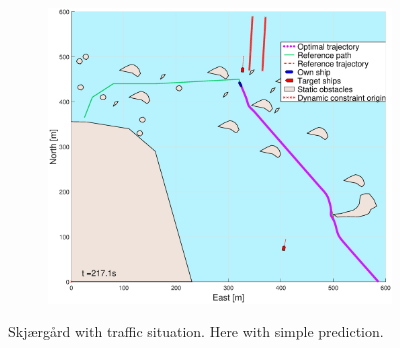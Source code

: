 \begin{figure}[ht]
\begin{subfigure}[b]{0.494\textwidth}
        \subcaption{}
    \end{subfigure}
    \hfill
    \begin{subfigure}[b]{0.494\textwidth}
        \centering
        \includegraphics[width=\textwidth]{Images/NewFigures/skjergard_m_trafikk_NEW/_Simple_1fig999_time=217}
        \subcaption{}
    \end{subfigure}
    \hfill
    \caption{Skjærgård with traffic situation. Here with simple prediction.}
\end{figure}
